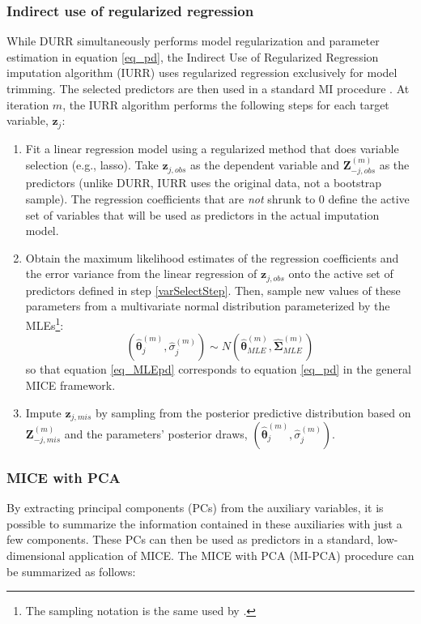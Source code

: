 \subsubsection{Indirect use of regularized regression}
	While DURR simultaneously performs model regularization and parameter estimation in equation \eqref{eq_pd}, the Indirect Use of Regularized Regression imputation algorithm (IURR) uses regularized regression exclusively for model trimming. The selected predictors are then used in a standard MI procedure \citep{zhaoLong:2016, dengEtAl:2016}.
	At iteration $m$, the IURR algorithm performs the following steps for each target variable, $\bm{z}_j$:
%
	\begin{enumerate}
%
	\item Fit a linear regression model using a regularized method that does variable selection (e.g., lasso). Take $\bm{z}_{j,obs}$ as the
		dependent variable and $\bm{Z}_{-j,obs}^{(m)}$ as the predictors (unlike DURR, IURR uses the original data, not a bootstrap sample).
		The regression coefficients that are \emph{not} shrunk to 0 define the active 
		set of variables that will be used as predictors in the actual imputation model. \label{varSelectStep}
	
	\item Obtain the maximum likelihood estimates of the regression coefficients and the error variance from the linear
		regression of $\bm{z}_{j,obs}$ onto the active set of predictors defined in step \ref{varSelectStep}. Then, sample new values of these parameters from a multivariate normal distribution
		parameterized by the MLEs\footnote{The sampling notation is the same used by \cite{dengEtAl:2016}.}:
%
		\begin{equation}\label{eq_MLEpd}
		(\hat{\bm{\theta}}_{j}^{(m)}, \hat{\sigma}_{j}^{(m)}) \sim N(\hat{\bm{\theta}}_{MLE}^{(m)}, 
			\hat{\bm{\Sigma}}_{MLE}^{(m)})
		\end{equation}
%
		so that equation \eqref{eq_MLEpd} corresponds to equation \eqref{eq_pd} in the general MICE framework.

	\item Impute $\bm{z}_{j,mis}$ by sampling from the posterior predictive distribution based 
		on $\bm{Z}_{-j,mis}^{(m)}$ and the parameters' posterior draws, $(\hat{\bm{\theta}}_{j}^{(m)}, 
		\hat{\sigma}_{j}^{(m)})$.
%
	\end{enumerate}

\subsubsection{MICE with PCA}
	By extracting principal components (PCs) from the auxiliary variables, it is possible to summarize the information 
	contained in these auxiliaries with just a few components.
	These PCs can then be used as predictors in a standard, low-dimensional application of MICE. The MICE with PCA (MI-PCA) procedure can be summarized as follows:

